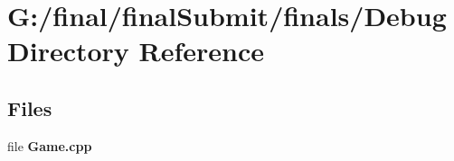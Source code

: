 \section{G\-:/final/final\-Submit/finals/\-Debug Directory Reference}
\label{dir_319ea9c3f8a480e6e8e611c42f71c02e}
\subsection*{Files}
\begin{DoxyCompactItemize}
\item 
file {\bf Game.\-cpp}
\end{DoxyCompactItemize}

